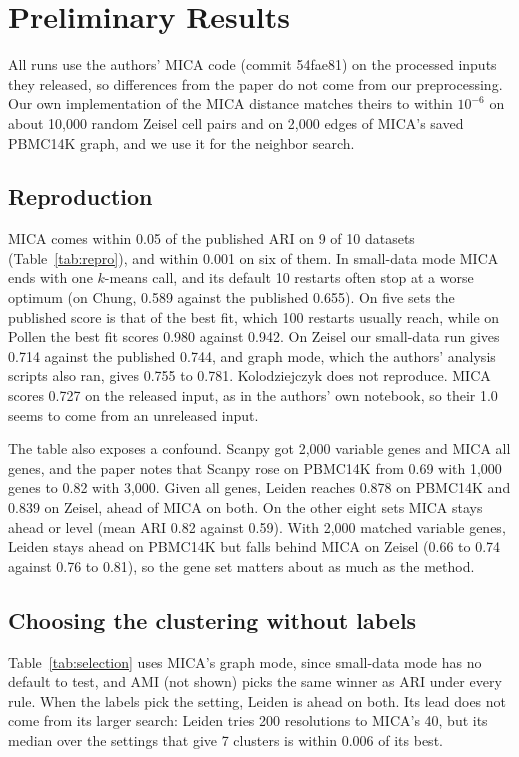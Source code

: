 \section{Preliminary Results}\label{sec:results}
All runs use the authors' MICA code (commit 54fae81) on the processed inputs they released, so differences from the paper do not come from our preprocessing. Our own implementation of the MICA distance matches theirs to within $10^{-6}$ on about 10,000 random Zeisel cell pairs and on 2,000 edges of MICA's saved PBMC14K graph, and we use it for the neighbor search.



\subsection{Reproduction}
MICA comes within 0.05 of the published ARI on 9 of 10 datasets (Table~\ref{tab:repro}), and within 0.001 on six of them. In small-data mode MICA ends with one $k$-means call, and its default 10 restarts often stop at a worse optimum (on Chung, 0.589 against the published 0.655). On five sets the published score is that of the best fit, which 100 restarts usually reach, while on Pollen the best fit scores 0.980 against 0.942. On Zeisel our small-data run gives 0.714 against the published 0.744, and graph mode, which the authors' analysis scripts also ran, gives 0.755 to 0.781. Kolodziejczyk does not reproduce. MICA scores 0.727 on the released input, as in the authors' own notebook, so their 1.0 seems to come from an unreleased input.

The table also exposes a confound. Scanpy got 2,000 variable genes and MICA all genes, and the paper notes that Scanpy rose on PBMC14K from 0.69 with 1,000 genes to 0.82 with 3,000. Given all genes, Leiden reaches 0.878 on PBMC14K and 0.839 on Zeisel, ahead of MICA on both. On the other eight sets MICA stays ahead or level (mean ARI 0.82 against 0.59). With 2,000 matched variable genes, Leiden stays ahead on PBMC14K but falls behind MICA on Zeisel (0.66 to 0.74 against 0.76 to 0.81), so the gene set matters about as much as the method.



\subsection{Choosing the clustering without labels}
Table~\ref{tab:selection} uses MICA's graph mode, since small-data mode has no default to test, and AMI (not shown) picks the same winner as ARI under every rule. When the labels pick the setting, Leiden is ahead on both. Its lead does not come from its larger search: Leiden tries 200 resolutions to MICA's 40, but its median over the settings that give 7 clusters is within 0.006 of its best.


